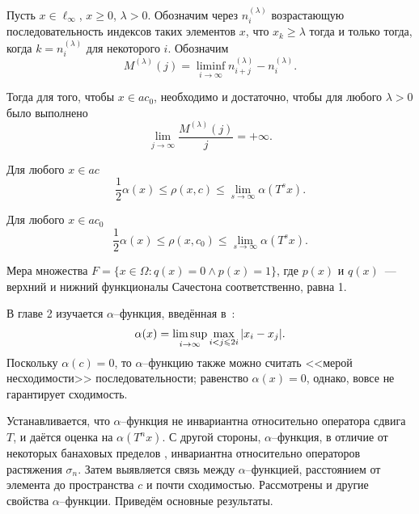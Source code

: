 	Пусть $x\in\ell_\infty$, $x \geq 0$, $\lambda>0$.
	Обозначим через $n^{(\lambda)}_i$ возрастающую последовательность
	индексов таких элементов $x$, что $x_k \geq \lambda$ тогда и только тогда,
	когда $k=n^{(\lambda)}_i$ для некоторого $i$.
	Обозначим
	\begin{equation}
		M^{(\lambda)}(j) = \liminf_{i\to\infty} n^{(\lambda)}_{i+j} - n^{(\lambda)}_i
		.
	\end{equation}


	Тогда для того, чтобы $x\in ac_0$, необходимо и достаточно, чтобы
	для любого $\lambda>0$ было выполнено
	\begin{equation}
		\lim_{j \to \infty} \frac{M^{(\lambda)}(j)}{j} = +\infty
		.
	\end{equation}

	Для любого $x\in ac$
	\begin{equation}
		\frac{1}{2} \alpha(x) \leq \rho(x,c)\leq \lim_{s\to\infty} \alpha(T^s x)
		.
	\end{equation}

	Для любого $x\in ac_0$
	\begin{equation}
		\frac{1}{2} \alpha(x) \leq \rho(x,c_0)\leq \lim_{s\to\infty} \alpha(T^s x)
		.
	\end{equation}

	Мера множества $F=\{x\in\Omega : q(x) = 0 \wedge p(x)= 1\}$,
	где $p(x)$ и $q(x)$~--- верхний и нижний функционалы Сачестона соответственно,
	равна 1.


В главе 2
изучается $\alpha$--функция, введённая в~\cite{our-vzms-2018}:
\begin{equation}
	\alpha(x) = \varlimsup_{i\to\infty} \max_{i<j\leqslant 2i} |x_i - x_j|
	.
\end{equation}
%
%
Поскольку $\alpha(c)=0$,
то $\alpha$--функцию также можно считать <<мерой несходимости>> последовательности;
равенство $\alpha(x) = 0$, однако, вовсе не гарантирует сходимость.

Устанавливается, что $\alpha$--функция не инвариантна относительно оператора сдвига $T$,
и даётся оценка на $\alpha(T^n x)$.
С другой стороны, $\alpha$--функция, в отличие от некоторых банаховых пределов
\cite{Semenov2010invariant,Semenov2011dan},
инвариантна относительно операторов растяжения $\sigma_n$.
Затем выявляется связь между $\alpha$--функцией, расстоянием от элемента до пространства $c$
и почти сходимостью.
Рассмотрены и другие свойства $\alpha$--функции.
Приведём основные результаты.

